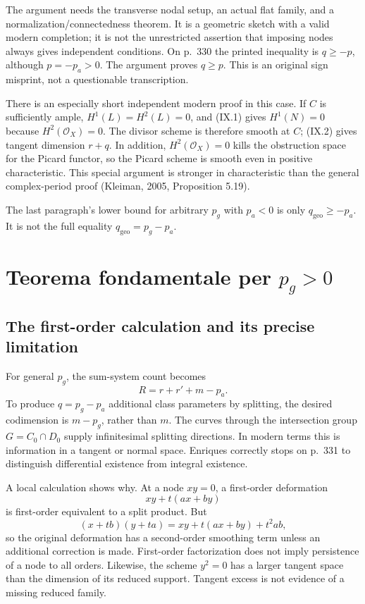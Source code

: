 The argument needs the transverse nodal setup, an actual flat family, and a normalization/connectedness theorem. It is a geometric sketch with a valid modern completion; it is not the unrestricted assertion that imposing nodes always gives independent conditions. On p.~330 the printed inequality is \(q\geq-p\), although \(p=-p_a>0\). The argument proves \(q\geq p\). This is an original sign misprint, not a questionable transcription.

There is an especially short independent modern proof in this case. If \(C\) is sufficiently ample, \(H^1(L)=H^2(L)=0\), and (IX.1) gives \(H^1(N)=0\) because \(H^2(\mathcal O_X)=0\). The divisor scheme is therefore smooth at \(C\); (IX.2) gives tangent dimension \(r+q\). In addition, \(H^2(\mathcal O_X)=0\) kills the obstruction space for the Picard functor, so the Picard scheme is smooth even in positive characteristic. This special argument is stronger in characteristic than the general complex-period proof (Kleiman, 2005, Proposition 5.19).

The last paragraph's lower bound for arbitrary \(p_g\) with \(p_a<0\) is only \(q_{\mathrm{geo}}\geq-p_a\). It is not the full equality \(q_{\mathrm{geo}}=p_g-p_a\).



\section{Teorema fondamentale per \texorpdfstring{\(p_g>0\)}{pg > 0}}\label{cp2-ix-5}

\subsection{The first-order calculation and its precise limitation}\label{cp2-ix-5-1}

For general \(p_g\), the sum-system count becomes
\[
R=r+r'+m-p_a.
\]
To produce \(q=p_g-p_a\) additional class parameters by splitting, the desired codimension is \(m-p_g\), rather than \(m\). The curves through the intersection group \(G=C_0\cap D_0\) supply infinitesimal splitting directions. In modern terms this is information in a tangent or normal space. Enriques correctly stops on p.~331 to distinguish differential existence from integral existence.

A local calculation shows why. At a node \(xy=0\), a first-order deformation
\[
xy+t(ax+by)
\]
is first-order equivalent to a split product. But
\[
(x+tb)(y+ta)=xy+t(ax+by)+t^2ab,
\]
so the original deformation has a second-order smoothing term unless an additional correction is made. First-order factorization does not imply persistence of a node to all orders. Likewise, the scheme \(y^2=0\) has a larger tangent space than the dimension of its reduced support. Tangent excess is not evidence of a missing reduced family.

